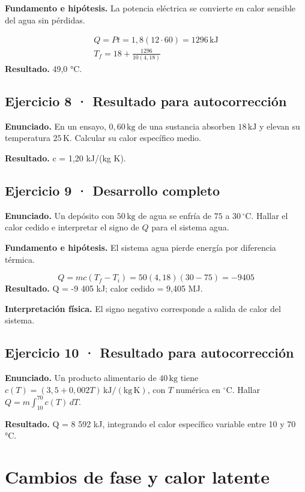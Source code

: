 \documentclass[11pt,a4paper]{article}
\begin{document}
\textbf{Fundamento e hipótesis.} La potencia eléctrica se convierte en calor sensible del agua sin pérdidas.

\[
\begin{gathered}
Q=Pt=1{,}8(12\cdot60)=1296\,\mathrm{kJ}\\T_f=18+\frac{1296}{10(4{,}18)}
\end{gathered}
\]
\textbf{Resultado.} 49,0 °C.


\subsection*{Ejercicio 8 · Resultado para autocorrección}
\textbf{Enunciado.} En un ensayo, \(0{,}60\,\mathrm{kg}\) de una sustancia absorben \(18\,\mathrm{kJ}\) y elevan su temperatura \(25\,\mathrm K\). Calcular su calor específico medio.

\textbf{Resultado.} c = 1,20 kJ/(kg K).


\subsection*{Ejercicio 9 · Desarrollo completo}
\textbf{Enunciado.} Un depósito con \(50\,\mathrm{kg}\) de agua se enfría de \(75\) a \(30\,^\circ\mathrm C\). Hallar el calor cedido e interpretar el signo de \(Q\) para el sistema agua.

\textbf{Fundamento e hipótesis.} El sistema agua pierde energía por diferencia térmica.

\[
Q=mc(T_f-T_i)=50(4{,}18)(30-75)=-9405
\]
\textbf{Resultado.} Q = -9 405 kJ; calor cedido = 9,405 MJ.

\textbf{Interpretación física.} El signo negativo corresponde a salida de calor del sistema.


\subsection*{Ejercicio 10 · Resultado para autocorrección}
\textbf{Enunciado.} Un producto alimentario de \(40\,\mathrm{kg}\) tiene \(c(T)=(3{,}5+0{,}002T)\,\mathrm{kJ/(kg\,K)}\), con \(T\) numérica en \(^\circ\mathrm C\). Hallar \(Q=m\int_{10}^{70}c(T)\,dT\).

\textbf{Resultado.} Q = 8 592 kJ, integrando el calor específico variable entre 10 y 70 °C.


\clearpage

\section{Cambios de fase y calor latente}
\end{document}
